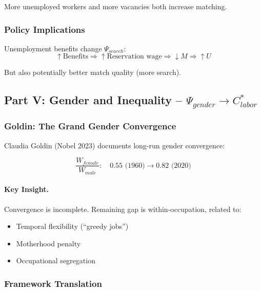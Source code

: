 More unemployed workers and more vacancies both increase matching.

\subsubsection{Policy Implications}

Unemployment benefits change $\Psi_{search}$:
\begin{equation}
\uparrow \text{Benefits} \Rightarrow \uparrow \text{Reservation wage} \Rightarrow \downarrow M \Rightarrow \uparrow U
\end{equation}

But also potentially better match quality (more search).

\subsection{Part V: Gender and Inequality – $\Psi_{gender} \to C^*_{labor}$}

\subsubsection{Goldin: The Grand Gender Convergence}

Claudia Goldin (Nobel 2023) documents long-run gender convergence:

\begin{equation}
\boxed{
\frac{W_{female}}{W_{male}}: \quad 0.55 \text{ (1960)} \to 0.82 \text{ (2020)}
}
\label{eq:goldin-convergence}
\end{equation}

\paragraph{Key Insight.}
Convergence is incomplete. Remaining gap is within-occupation, related to:
\begin{itemize}
    \item Temporal flexibility (``greedy jobs'')
    \item Motherhood penalty
    \item Occupational segregation
\end{itemize}

\subsubsection{Framework Translation}

